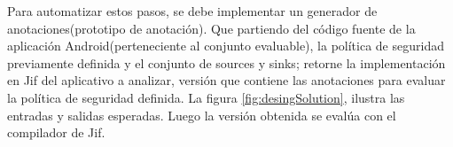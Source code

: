 Para automatizar estos pasos, se debe implementar un generador de
anotaciones(prototipo de anotación). Que partiendo del código fuente de la
aplicación Android(perteneciente al conjunto evaluable), la política de
seguridad previamente definida y el conjunto de sources y sinks; retorne
la implementación en Jif del aplicativo a analizar, versión que contiene las
anotaciones para evaluar la política de seguridad definida.\newline 
La figura \ref{fig:desingSolution}, ilustra las entradas y salidas 
esperadas.\newline 
Luego la versión obtenida se evalúa con el compilador de Jif.



